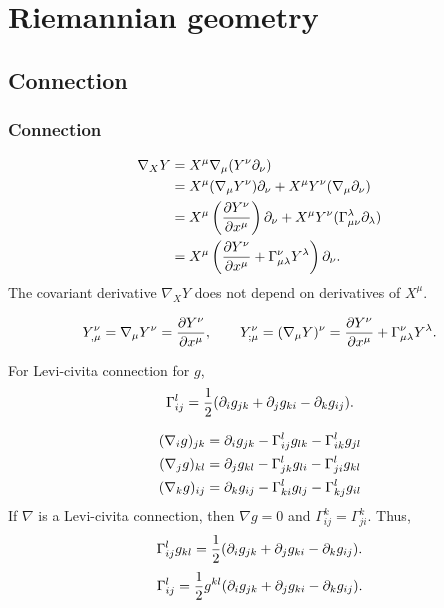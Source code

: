 \documentclass{../crs}
\begin{document}
\chapter{Riemannian geometry}

\section{Connection}


\subsection{Connection}

\begin{align*}
\nabla_XY&=X^\mu\nabla_\mu(Y^\nu\pd_\nu)\\
&=X^\mu(\nabla_\mu Y^\nu)\pd_\nu+X^\mu Y^\nu(\nabla_\mu\pd_\nu)\\
&=X^\mu\left(\pd{Y^\nu}{x^\mu}\right)\pd_\nu+X^\mu Y^\nu(\Gamma_{\mu\nu}^\lambda\pd_\lambda)\\
&=X^\mu\left(\pd{Y^\nu}{x^\mu}+\Gamma_{\mu\lambda}^\nu Y^\lambda\right)\pd_\nu.
\end{align*}
The covariant derivative $\nabla_XY$ does not depend on derivatives of $X^\mu$.

\[Y^\nu_{,\mu}=\nabla_\mu Y^\nu=\pd{Y^\nu}{x^\mu},\qquad Y^\nu_{;\mu}=(\nabla_\mu Y)^\nu=\pd{Y^\nu}{x^\mu}+\Gamma_{\mu\lambda}^\nu Y^\lambda.\]
\begin{thm}
For Levi-civita connection for $g$,
\[\Gamma^l_{ij}=\frac12(\pd_ig_{jk}+\pd_jg_{ki}-\pd_kg_{ij}).\]
\end{thm}
\begin{pf}
\begin{align*}
(\nabla_ig)_{jk}&=\pd_ig_{jk}-\Gamma^l_{ij}g_{lk}-\Gamma^l_{ik}g_{jl}\\
(\nabla_jg)_{kl}&=\pd_jg_{kl}-\Gamma^l_{jk}g_{li}-\Gamma^l_{ji}g_{kl}\\
(\nabla_kg)_{ij}&=\pd_kg_{ij}-\Gamma^l_{ki}g_{lj}-\Gamma^l_{kj}g_{il}\\
\end{align*}
If $\nabla$ is a Levi-civita connection, then $\nabla g=0$ and $\Gamma_{ij}^k=\Gamma_{ji}^k$.
Thus,
\[\Gamma^l_{ij}g_{kl}=\frac12(\pd_ig_{jk}+\pd_jg_{ki}-\pd_kg_{ij}).\]
\[\Gamma^l_{ij}=\frac12g^{kl}(\pd_ig_{jk}+\pd_jg_{ki}-\pd_kg_{ij}).\]
\end{pf}
\end{document}
